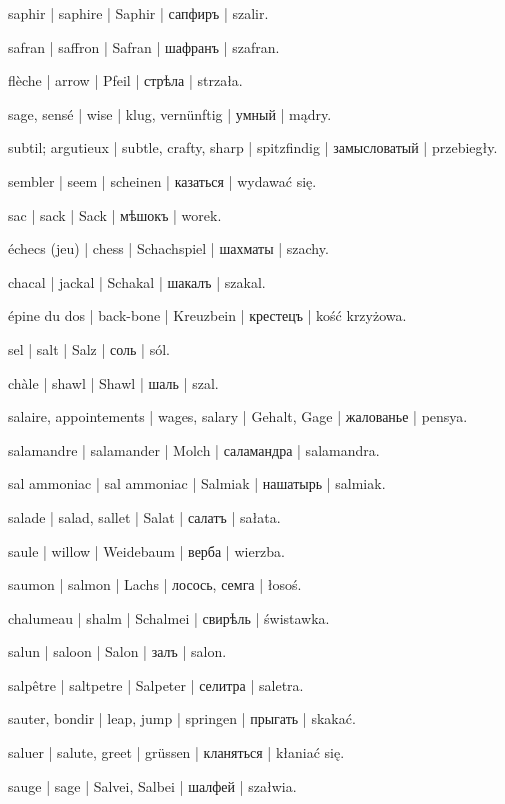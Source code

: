 \begin{outdent}{1em}
saphir | saphire | Saphir | сапфиръ | szalir.

safran | saffron | Safran | шафранъ | szafran.

flèche | arrow | Pfeil | стрѣла | strzała.

sage, sensé | wise | klug, vernünftig | умный | mądry.

subtil; argutieux | subtle, crafty, sharp | spitzfindig | замысловатый | przebiegły.

sembler | seem | scheinen | казаться | wydawać się.

sac | sack | Sack | мѣшокъ | worek.

échecs (jeu) | chess | Schachspiel | шахматы | szachy.

chacal | jackal | Schakal | шакалъ | szakal.

épine du dos | back-bone | Kreuzbein | крестецъ | kość krzyżowa.

sel | salt | Salz | соль | sól.

chàle | shawl | Shawl | шаль | szal.

salaire, appointements | wages, salary | Gehalt, Gage | жалованье | pensya.

salamandre | salamander | Molch | саламандра | salamandra.

sal ammoniac | sal ammoniac | Salmiak | нашатырь | salmiak.

salade | salad, sallet | Salat | салатъ | sałata.

saule | willow | Weidebaum | верба | wierzba.

saumon | salmon | Lachs | лосось, семга | łosoś.

chalumeau | shalm | Schalmei | свирѣль | świstawka.

salun | saloon | Salon | залъ | salon.

salpêtre | saltpetre | Salpeter | селитра | saletra.

sauter, bondir | leap, jump | springen | прыгать | skakać.

saluer | salute, greet | grüssen | кланяться | kłaniać się.

sauge | sage | Salvei, Salbei | шалфей | szałwia.


\end{outdent}
